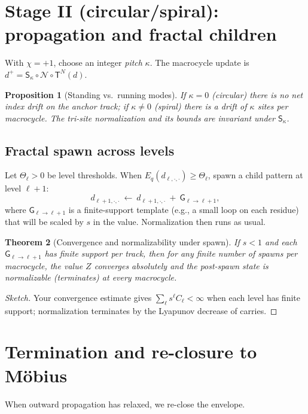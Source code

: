 \documentclass[11pt]{article}
\newtheorem{theorem}{Theorem}[section]
\newtheorem{proposition}[theorem]{Proposition}
\theoremstyle{definition}
\theoremstyle{remark}
\begin{document}
\section{Stage II (circular/spiral): propagation and fractal children}\label{sec:spiral}
With $\chi=+1$, choose an integer \emph{pitch} $\kappa$. The macrocycle update is $d^+=\mathsf S_\kappa\circ \mathcal N\circ \mathsf T^N(d)$.

\begin{proposition}[Standing vs.\ running modes]
If $\kappa=0$ (circular) there is no net index drift on the anchor track; if $\kappa\neq0$ (spiral) there is a drift of $\kappa$ sites per macrocycle. The tri-site normalization and its bounds are invariant under $\mathsf S_\kappa$.
\end{proposition}

\subsection{Fractal spawn across levels}
Let $\Theta_\ell>0$ be level thresholds. When $E_q(d_{\ell,\cdot,\cdot})\ge \Theta_\ell$, spawn a child pattern at level $\ell+1$:
\begin{equation}
d_{\ell+1,\cdot,\cdot}\ \leftarrow\ d_{\ell+1,\cdot,\cdot}\ +\ \mathsf G_{\ell\to\ell+1},
\end{equation}
where $\mathsf G_{\ell\to\ell+1}$ is a finite-support template (e.g., a small loop on each residue) that will be scaled by $s$ in the value.
Normalization then runs as usual.

\begin{theorem}[Convergence and normalizability under spawn]
If $s<1$ and each $\mathsf G_{\ell\to\ell+1}$ has finite support per track, then for any finite number of spawns per macrocycle, the value $Z$ converges absolutely and the post-spawn state is normalizable (terminates) at every macrocycle.
\end{theorem}

\begin{proof}[Sketch]
Your convergence estimate gives $\sum_\ell s^\ell C_\ell<\infty$ when each level has finite support; normalization terminates by the Lyapunov decrease of carries.
\end{proof}

\section{Termination and re-closure to M\"obius}\label{sec:reclose}
When outward propagation has relaxed, we re-close the envelope.
\end{document}
